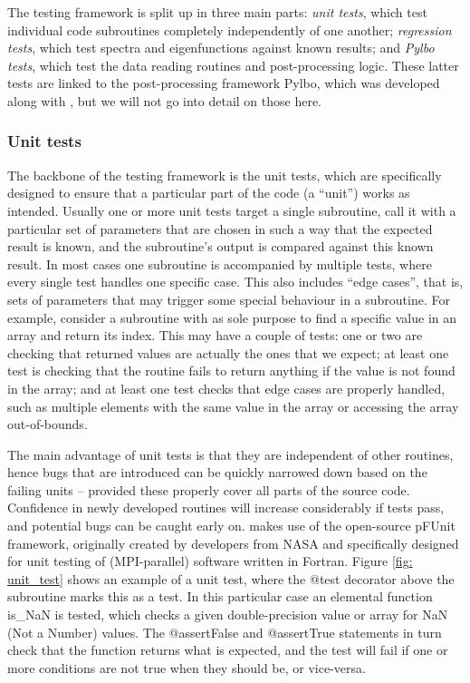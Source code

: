 The {\legolas} testing framework is split up in three main parts: \emph{unit tests}, which test individual code subroutines completely independently of one another; \emph{regression tests}, which test spectra and eigenfunctions against known results; and \emph{Pylbo tests}, which test the data reading routines and post-processing logic. These latter tests are linked to the post-processing framework \textsf{Pylbo}, which was developed along with {\legolas}, but we will not go into detail on those here.

\subsubsection{Unit tests}
The backbone of the testing framework is the unit tests, which are specifically designed to ensure that a particular part of the code (a ``unit'') works as intended. Usually one or more unit tests target a single subroutine, call it with a particular set of parameters that are chosen in such a way that the expected result is known, and the subroutine's output is compared against this known result. In most cases one subroutine is accompanied by multiple tests, where every single test handles one specific case. This also includes ``edge cases'', that is, sets of parameters that may trigger some special behaviour in a subroutine. For example, consider a subroutine with as sole purpose to find a specific value in an array and return its index. This may have a couple of tests: one or two are checking that returned values are actually the ones that we expect; at least one test is checking that the routine fails to return anything if the value is not found in the array; and at least one test checks that edge cases are properly handled, such as multiple elements with the same value in the array or accessing the array out-of-bounds.

The main advantage of unit tests is that they are independent of other routines, hence bugs that are introduced can be quickly narrowed down based on the failing units -- provided these properly cover all parts of the source code. Confidence in newly developed routines will increase considerably if tests pass, and potential bugs can be caught early on. {\legolas} makes use of the open-source pFUnit framework, originally created by developers from NASA and specifically designed for unit testing of (MPI-parallel) software written in Fortran. Figure \ref{fig: unit_test} shows an example of a unit test, where the \textsf{{@}test} decorator above the subroutine marks this as a test. In this particular case an elemental function \textsf{is\_NaN} is tested, which checks a given double-precision value or array for NaN (Not a Number) values. The \textsf{{@}assertFalse} and \textsf{{@}assertTrue} statements in turn check that the function returns what is expected, and the test will fail if one or more conditions are not true when they should be, or vice-versa.

